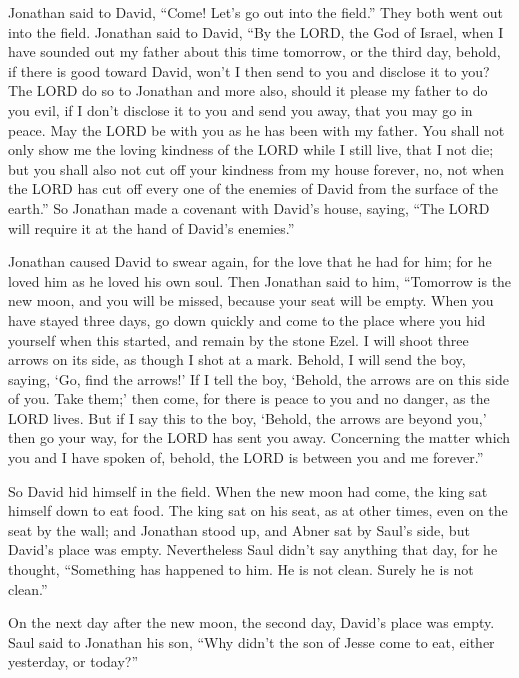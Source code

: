 \myverse{}Jonathan said to David, “Come! Let’s go out into the field.”
They both went out into the field.
\myverse{}Jonathan said to David, “By the LORD, the God of Israel, when I have sounded
out my father about this time tomorrow, or the third day, behold, if there is good toward David, won’t
I then send to you and disclose it to you?
\myverse{}The LORD do so to Jonathan and more also, should it please my father to do
you evil, if I don’t disclose it to you and send you away, that you may go in peace. May the LORD be with
you as he has been with my father.
\myverse{}You shall not only show me the loving kindness of the LORD while I still
live, that I not die;
\myverse{}but you shall also not cut off your kindness from my house forever, no, not
when the LORD has cut off every one of the enemies of David from the surface of the earth.”
\myverse{}So Jonathan made a covenant with David’s house, saying, “The LORD will require
it at the hand of David’s enemies.”

\myverse{}Jonathan caused David to swear again, for the love that he had
for him; for he loved him as he loved his own soul.
\myverse{}Then Jonathan said to him, “Tomorrow is the new moon, and you will be missed,
because your seat will be empty.
\myverse{}When you have stayed three days, go down quickly and come to the place where
you hid yourself when this started, and remain by the stone Ezel.
\myverse{}I will shoot three arrows on its side, as though I shot at a mark.
\myverse{}Behold, I will send the boy, saying, ‘Go, find the arrows!’ If I tell the
boy, ‘Behold, the arrows are on this side of you. Take them;’ then come, for there is peace to you and
no danger, as the LORD lives.
\myverse{}But if I say this to the boy, ‘Behold, the arrows are beyond you,’ then go
your way, for the LORD has sent you away.
\myverse{}Concerning the matter which you and I have spoken of, behold, the LORD is
between you and me forever.”

\myverse{}So David hid himself in the field. When the new moon had come,
the king sat himself down to eat food.
\myverse{}The king sat on his seat, as at other times, even on the seat by the wall;
and Jonathan stood up, and Abner sat by Saul’s side, but David’s place was empty.
\myverse{}Nevertheless Saul didn’t say anything that day, for he thought, “Something
has happened to him. He is not clean. Surely he is not clean.”

\myverse{}On the next day after the new moon, the second day, David’s
place was empty. Saul said to Jonathan his son, “Why didn’t the son of Jesse come to eat, either yesterday,
or today?”

